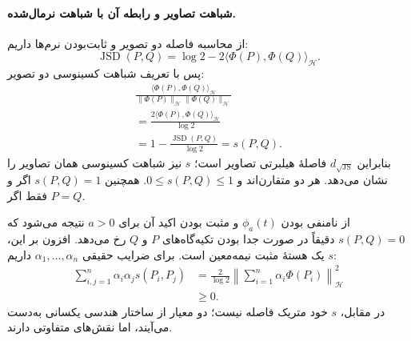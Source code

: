 \paragraph{شباهت تصاویر و رابطه آن با شباهت نرمال‌شده.}
از محاسبه فاصله دو تصویر و ثابت‌بودن نرم‌ها داریم:
\begin{equation}\label{cmp:eq:ch3-js-Hilbert-cosine}
\operatorname{JSD}(P,Q)=\log2-2\langle\Phi(P),\Phi(Q)\rangle_{\mathcal H}.
\end{equation}
پس با تعریف شباهت کسینوسی دو تصویر:
\begin{equation}\label{cmp:eq:ch3-js-similarity}
\begin{gathered}
\frac{\langle\Phi(P),\Phi(Q)\rangle_{\mathcal H}}
{\|\Phi(P)\|_{\mathcal H}\|\Phi(Q)\|_{\mathcal H}}\\
=\frac{2\langle\Phi(P),\Phi(Q)\rangle_{\mathcal H}}{\log2}\\
=1-\frac{\operatorname{JSD}(P,Q)}{\log2}
=s(P,Q).
\end{gathered}
\end{equation}
بنابراین $d_{\sqrt{\mathrm{JS}}}$ فاصلهٔ هیلبرتی تصاویر است؛
$s$ نیز شباهت کسینوسی همان تصاویر را نشان می‌دهد.
هر دو متقارن‌اند و $0\le s(P,Q)\le1$.
همچنین $s(P,Q)=1$ اگر و فقط اگر $P=Q$.

از نامنفی بودن $\phi_a(t)$
و مثبت بودن اکید آن برای $a>0$ نتیجه می‌شود
که $s(P,Q)=0$ دقیقاً در صورت جدا بودن
تکیه‌گاه‌های $P$ و $Q$ رخ می‌دهد.
افزون بر این، $s$ یک هستهٔ مثبت نیمه‌معین است.
برای ضرایب حقیقی $\alpha_1,\ldots,\alpha_n$ داریم:
\begin{equation}\label{eq:app-pd-similarity-psd}
\begin{aligned}
\sum_{i,j=1}^{n}\alpha_i\alpha_j s(P_i,P_j)
&=\frac{2}{\log2}
\left\|\sum_{i=1}^{n}\alpha_i\Phi(P_i)\right\|_{\mathcal H}^2\\
&\ge0.
\end{aligned}
\end{equation}
در مقابل، $s$ خود متریک فاصله نیست؛ دو معیار از ساختار هندسی یکسانی به‌دست می‌آیند، اما نقش‌های متفاوتی دارند.

